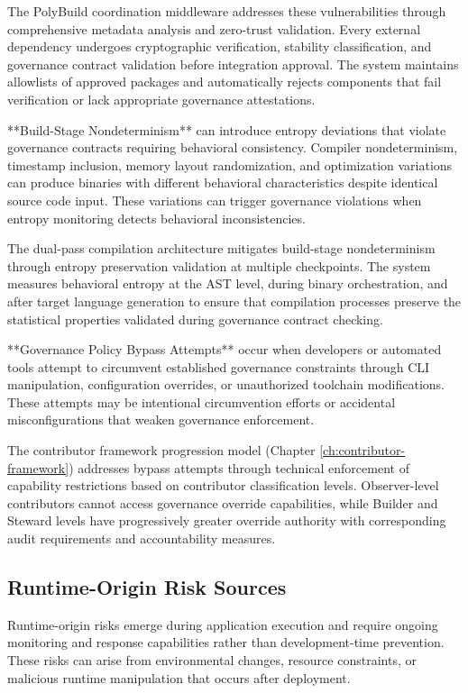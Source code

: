 The PolyBuild coordination middleware addresses these vulnerabilities through comprehensive metadata analysis and zero-trust validation. Every external dependency undergoes cryptographic verification, stability classification, and governance contract validation before integration approval. The system maintains allowlists of approved packages and automatically rejects components that fail verification or lack appropriate governance attestations.

**Build-Stage Nondeterminism** can introduce entropy deviations that violate governance contracts requiring behavioral consistency. Compiler nondeterminism, timestamp inclusion, memory layout randomization, and optimization variations can produce binaries with different behavioral characteristics despite identical source code input. These variations can trigger governance violations when entropy monitoring detects behavioral inconsistencies.

The dual-pass compilation architecture mitigates build-stage nondeterminism through entropy preservation validation at multiple checkpoints. The system measures behavioral entropy at the AST level, during binary orchestration, and after target language generation to ensure that compilation processes preserve the statistical properties validated during governance contract checking.

**Governance Policy Bypass Attempts** occur when developers or automated tools attempt to circumvent established governance constraints through CLI manipulation, configuration overrides, or unauthorized toolchain modifications. These attempts may be intentional circumvention efforts or accidental misconfigurations that weaken governance enforcement.

The contributor framework progression model (Chapter \ref{ch:contributor-framework}) addresses bypass attempts through technical enforcement of capability restrictions based on contributor classification levels. Observer-level contributors cannot access governance override capabilities, while Builder and Steward levels have progressively greater override authority with corresponding audit requirements and accountability measures.

\subsection{Runtime-Origin Risk Sources}

Runtime-origin risks emerge during application execution and require ongoing monitoring and response capabilities rather than development-time prevention. These risks can arise from environmental changes, resource constraints, or malicious runtime manipulation that occurs after deployment.

